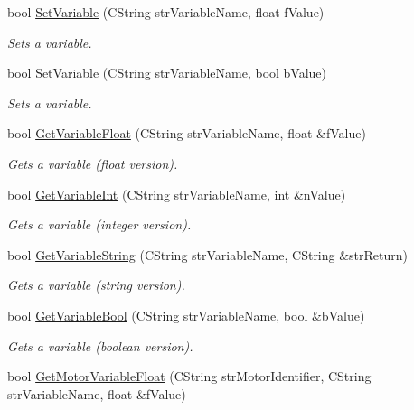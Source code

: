 \begin{CompactItemize}
bool \hyperlink{classTangoInterface_bbad345c34f9c25f013be3bbc02cfe96}{SetVariable} (CString strVariableName, float fValue)
\begin{CompactList}\small\item\em Sets a variable. \item\end{CompactList}\item 
bool \hyperlink{classTangoInterface_d99eec46ef2205c72d4dc562154f6474}{SetVariable} (CString strVariableName, bool bValue)
\begin{CompactList}\small\item\em Sets a variable. \item\end{CompactList}\item 
bool \hyperlink{classTangoInterface_f981459258550748b98541a18c6e8f54}{GetVariableFloat} (CString strVariableName, float \&fValue)
\begin{CompactList}\small\item\em Gets a variable (float version). \item\end{CompactList}\item 
bool \hyperlink{classTangoInterface_ea841d48dfb2d66019268beda8ba2da5}{GetVariableInt} (CString strVariableName, int \&nValue)
\begin{CompactList}\small\item\em Gets a variable (integer version). \item\end{CompactList}\item 
bool \hyperlink{classTangoInterface_90bceaea83a14b34d3a6c4dca7f5756b}{GetVariableString} (CString strVariableName, CString \&strReturn)
\begin{CompactList}\small\item\em Gets a variable (string version). \item\end{CompactList}\item 
bool \hyperlink{classTangoInterface_92743acefced68c408d846813dba4697}{GetVariableBool} (CString strVariableName, bool \&bValue)
\begin{CompactList}\small\item\em Gets a variable (boolean version). \item\end{CompactList}\item 
bool \hyperlink{classTangoInterface_c2f7cbbe72be043cbadf73a8bf23654d}{GetMotorVariableFloat} (CString strMotorIdentifier, CString strVariableName, float \&fValue)

\end{CompactItemize}
